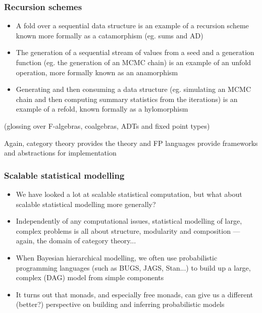 \documentclass[mathserif,handout]{beamer}
\begin{document}
\begin{frame}
  \frametitle{Recursion schemes}
  \begin{itemize}
  \item A \alert{fold} over a sequential data structure is an example of a recursion scheme known more formally as a \alert{catamorphism} (eg. sums and AD)
  \item The generation of a sequential stream of values from a seed and a generation function (eg. the generation of an MCMC chain) is an example of an \alert{unfold} operation, more formally known as an \alert{anamorphism}
    \item Generating and then consuming a data structure (eg. simulating an MCMC chain and then computing summary statistics from the iterations) is an example of a \alert{refold}, known formally as a \alert{hylomorphism}
  \end{itemize}
  (glossing over \alert{F-algebras}, \alert{coalgebras}, \alert{ADTs} and \alert{fixed point types})
  \medskip
  
  Again, category theory provides the theory and FP languages provide frameworks and abstractions for implementation
\end{frame}



\begin{frame}[fragile]
  \frametitle{Scalable statistical modelling}
  \begin{itemize}
  \item We have looked a lot at scalable statistical \alert{computation}, but what about scalable statistical \alert{modelling} more generally?
  \item Independently of any computational issues, statistical modelling of large, complex problems is all about structure, modularity and composition --- again, the domain of category theory...
  \item When Bayesian hierarchical modelling, we often use \alert{probabilistic programming languages} (such as BUGS, JAGS, Stan...) to build up a large, complex (DAG) model from simple components
    \item It turns out that \alert{monads}, and especially \alert{free monads}, can give us a different (better?) perspective on building and inferring probabilistic models
  \end{itemize}
\end{frame}
\end{document}
